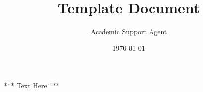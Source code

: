 \documentclass{article}
\title{Template Document}
\author{Academic Support Agent}
\date{\today}
\begin{document}
\maketitle

*** Text Here ***
\end{document}
